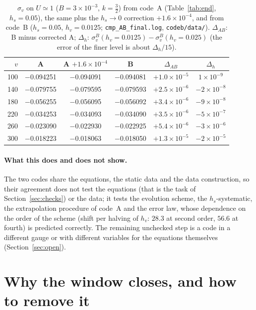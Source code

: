 \documentclass[11pt]{article}
\begin{document}
\begin{table}[ht]\centering\small
\caption{$\sigma_v$ on $U\simeq1$ ($B=3\times10^{-3}$, $k=\tfrac32$) from code~A (Table~\ref{tab:end}, $h_s=0.05$), the same plus the $h_s\to0$ correction $+1.6\times10^{-4}$, and from code~B ($h_s=0.05$, $h_v=0.0125$; \texttt{cmp\_AB\_final.log}, \texttt{codeb/data/}). $\Delta_{AB}$: B minus corrected A; $\Delta_h$: $\sigma_v^{B}(h_v=0.0125)-\sigma_v^{B}(h_v=0.025)$ (the error of the finer level is about $\Delta_h/15$).}\label{tab:codeb}
\begin{tabular}{rccccc}
\toprule
$v$ & A & A $+1.6\!\times\!10^{-4}$ & B & $\Delta_{AB}$ & $\Delta_h$\\\midrule
100 & $-$0.094251 & $-$0.094091 & $-$0.094081 & $+1.0\!\times\!10^{-5}$ & $1\!\times\!10^{-9}$\\
140 & $-$0.079755 & $-$0.079595 & $-$0.079593 & $+2.5\!\times\!10^{-6}$ & $-2\!\times\!10^{-8}$\\
180 & $-$0.056255 & $-$0.056095 & $-$0.056092 & $+3.4\!\times\!10^{-6}$ & $-9\!\times\!10^{-8}$\\
220 & $-$0.034253 & $-$0.034093 & $-$0.034090 & $+3.5\!\times\!10^{-6}$ & $-5\!\times\!10^{-7}$\\
260 & $-$0.023090 & $-$0.022930 & $-$0.022925 & $+5.4\!\times\!10^{-6}$ & $-3\!\times\!10^{-6}$\\
300 & $-$0.018223 & $-$0.018063 & $-$0.018050 & $+1.3\!\times\!10^{-5}$ & $-2\!\times\!10^{-5}$\\\bottomrule
\end{tabular}
\end{table}

\paragraph{What this does and does not show.} The two codes share the equations, the static data and the data construction, so their agreement does not test the equations (that is the task of Section~\ref{sec:checks}) or the data; it tests the evolution scheme, the $h_s$-systematic, the extrapolation procedure of code~A and the error law, whose dependence on the order of the scheme (shift per halving of $h_v$: $28.3$ at second order, $56.6$ at fourth) is predicted correctly. The remaining unchecked step is a code in a different gauge or with different variables for the equations themselves (Section~\ref{sec:open}).

\section{Why the window closes, and how to remove it}
\label{sec:mech}
\end{document}
